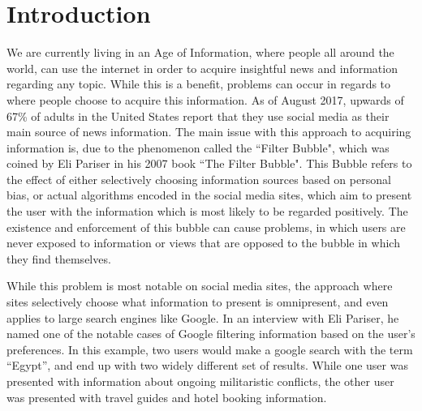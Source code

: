 \chapter{Introduction}
We are currently living in an Age of Information, where people all around the
world, can use the internet in order to acquire insightful news and information
regarding any topic. While this is a benefit, problems can occur in regards to
where people choose to acquire this information. As of August 2017, upwards of
67\% of adults in the United States report that they use social media as their
main source of news information\citep{journalism2017}. The main issue with this
approach to acquiring information is, due to the phenomenon called the ``Filter
Bubble", which was coined by Eli Pariser in his 2007 book ``The Filter
Bubble"\citep{pariser2011filter}. This Bubble refers to the effect of either
selectively choosing information sources based on personal bias, or actual
algorithms encoded in the social media sites, which aim to present the user with
the information which is most likely to be regarded positively. The existence
and enforcement of this bubble can cause problems, in which users are never
exposed to information or views that are opposed to the bubble in which they
find themselves.

While this problem is most notable on social media sites, the approach where
sites selectively choose what information to present is omnipresent, and even
applies to large search engines like Google\citep{filterBubbleDef}. In an
interview with Eli Pariser, he named one of the notable cases of Google
filtering information based on the user's preferences. In this example, two
users would make a google search with the term ``Egypt'', and end up with two
widely different set of results. While one user was presented with information
about ongoing militaristic conflicts, the other user was presented with travel
guides and hotel booking information\citep{nusSduSearch}.
